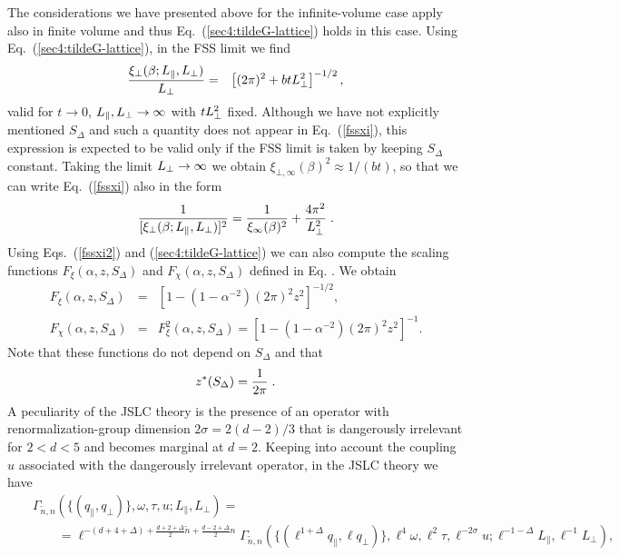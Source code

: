 \documentclass[12pt]{article}
\begin{document}
The considerations we have presented above for the infinite-volume case
apply also in finite volume and thus Eq.~(\ref{sec4:tildeG-lattice}) 
holds in this case.
Using Eq.~(\ref{sec4:tildeG-lattice}), in the FSS limit we find
\begin{eqnarray}
\label{fssxi}
        \frac{{\xi}_\bot(\beta;L_{\|},L_{\bot})}{L_\bot} &=& 
        \left[ (2\pi)^2 +  b t L_{\bot}^2 \right]^{-1/2}, 
\end{eqnarray}
valid for $t\to 0$, $L_{\|},L_{\bot}\to \infty$ with $t L_{\bot}^2$ fixed.
Although we have not explicitly mentioned $S_\Delta$ and 
such a quantity does not appear in 
Eq.~(\ref{fssxi}), this expression is 
expected to be valid only if the FSS limit is taken by keeping 
$S_\Delta$ constant.
Taking the limit $L_{\bot}\to\infty$ we obtain 
$\xi_{\bot,\infty}(\beta)^2 \approx  1/(b t)$,
so that we can write Eq.~(\ref{fssxi}) also in the form
\begin{equation}
\label{fssxi2}
{1\over [{\xi}_\bot(\beta;L_{\|},L_{\bot} )]^2} =
      {1\over \xi_\infty(\beta)^2} + {4\pi^2\over L_\bot^2} \; .
\end{equation}
Using Eqs.~(\ref{fssxi2}) and (\ref{sec4:tildeG-lattice})
 we can also compute the scaling functions 
$F_\xi(\alpha,z,S_\Delta)$ and $F_\chi(\alpha,z,S_\Delta)$ 
defined in Eq. . We obtain
\begin{eqnarray}
        F_{\xi}(\alpha,z,S_\Delta) &=& 
        \left[ 1- \left(1 -\alpha^{-2}\right)(2\pi)^2 z^2
         \right]^{-1/2},
\label{eq:theoretical_pred} \\
F_{\chi} (\alpha,z,S_\Delta) &=& F_\xi^2(\alpha,z,S_\Delta) = 
   \left[1- \left(1 -\alpha^{-2}\right)(2\pi)^2 z^2\right]^{-1}.
\label{eq:theoretical_pred_chi} 
\end{eqnarray}
Note that these functions do not depend on $S_\Delta$ and that 
\begin{equation}
z^*(S_\Delta) = {1\over 2\pi} \; .
\end{equation}
A peculiarity of the JSLC theory 
is the presence of an operator with renormalization-group dimension 
$2\sigma = 2(d-2)/3$ that is dangerously irrelevant
for $2 < d < 5$ and becomes marginal at $d=2$. 
Keeping into account the coupling $u$ associated with the dangerously 
irrelevant operator, in the JSLC theory we have \cite{Janssen86a}
\begin{eqnarray}
&& \Gamma_{\tilde n,n}(\{(q_{\|}, q_\bot )\},\omega,\tau,u;L_\|, L_{\bot}) = 
\label{scaling-Gamma-nnt} \\
&& \qquad = 
\ell^{-(d+4+\Delta)+\frac{d+2+\Delta}{2} \tilde n +\frac{d-2+\Delta}{2} n}
\Gamma_{\tilde n,n}(\{(\ell^{1+\Delta} q_{\|}, \ell q_{\bot})\}, 
\ell^{4} \omega,
\ell^{2} \tau,\ell^{-2\sigma} u;\ell^{-1-\Delta}L_{\|},\ell^{-1} L_{\bot}),
\nonumber 
\end{eqnarray}
\end{document}
